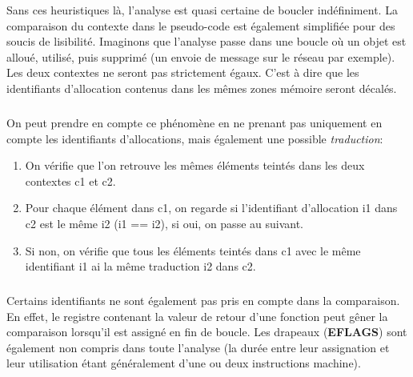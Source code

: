 Sans ces heuristiques là, l'analyse est quasi certaine de boucler indéfiniment. La comparaison du contexte dans le pseudo-code est également simplifiée pour des soucis de lisibilité.
Imaginons que l'analyse passe dans une boucle où un objet est alloué, utilisé, puis supprimé (un envoie de message sur le réseau par exemple). Les deux contextes
ne seront pas strictement égaux. C'est à dire que les identifiants d'allocation contenus dans les mêmes zones mémoire seront décalés.
\subparagraph{}
\newpage
On peut prendre en compte ce phénomène en ne prenant pas uniquement en compte les identifiants d'allocations, mais également une possible \textit{traduction}:
\begin{enumerate}
    \item On vérifie que l'on retrouve les mêmes éléments teintés dans les deux contextes c1 et c2.
    \item Pour chaque élément dans c1, on regarde si l'identifiant d'allocation i1 dans c2 est le même i2 (i1 == i2), si oui, on passe au suivant.
    \item Si non, on vérifie que tous les éléments teintés dans c1 avec le même identifiant i1 ai la même traduction i2 dans c2.
\end{enumerate}
\subparagraph{}
Certains identifiants ne sont également pas pris en compte dans la comparaison. En effet, le registre contenant la valeur de retour d'une fonction peut gêner la comparaison
lorsqu'il est assigné en fin de boucle. Les drapeaux (\textbf{EFLAGS}) sont également non compris dans toute l'analyse (la durée entre leur assignation et leur utilisation étant généralement d'une
ou deux instructions machine).


